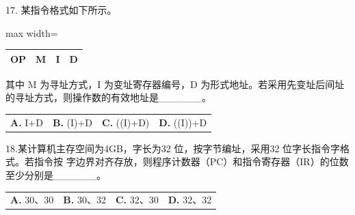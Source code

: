 \documentclass[UTF8,11pt]{ctexart}
\begin{document}
17. 某指令格式如下所示。


\begin{center}\begin{adjustbox}{max width=\linewidth}\begin{tabular}{|>{\raggedright\arraybackslash}p{\dimexpr(\linewidth-8\tabcolsep-5\arrayrulewidth)/4\relax}|>{\raggedright\arraybackslash}p{\dimexpr(\linewidth-8\tabcolsep-5\arrayrulewidth)/4\relax}|>{\raggedright\arraybackslash}p{\dimexpr(\linewidth-8\tabcolsep-5\arrayrulewidth)/4\relax}|>{\raggedright\arraybackslash}p{\dimexpr(\linewidth-8\tabcolsep-5\arrayrulewidth)/4\relax}|}\hline
OP & M & I & D\\\hline\end{tabular}\end{adjustbox}\end{center}

其中 M 为寻址方式，I 为变址寄存器编号，D 为形式地址。若采用先变址后间址的寻址方式，则操作数的有效地址是\_\_\_\_\_\_。


\begin{center}\begin{tabular}{>{\raggedright\arraybackslash}p{\dimexpr(\linewidth-8\tabcolsep)/4\relax}>{\raggedright\arraybackslash}p{\dimexpr(\linewidth-8\tabcolsep)/4\relax}>{\raggedright\arraybackslash}p{\dimexpr(\linewidth-8\tabcolsep)/4\relax}>{\raggedright\arraybackslash}p{\dimexpr(\linewidth-8\tabcolsep)/4\relax}}
\textbf{A.} I+D & \textbf{B.} (I)+D & \textbf{C.} ((I)+D) & \textbf{D.} ((I))+D\\[.35em]\end{tabular}\end{center}

18.某计算机主存空间为4GB，字长为32 位，按字节编址，采用32 位字长指令字格式。若指令按 字边界对齐存放，则程序计数器（PC）和指令寄存器（IR）的位数至少分别是\_\_\_\_\_\_。


\begin{center}\begin{tabular}{>{\raggedright\arraybackslash}p{\dimexpr(\linewidth-8\tabcolsep)/4\relax}>{\raggedright\arraybackslash}p{\dimexpr(\linewidth-8\tabcolsep)/4\relax}>{\raggedright\arraybackslash}p{\dimexpr(\linewidth-8\tabcolsep)/4\relax}>{\raggedright\arraybackslash}p{\dimexpr(\linewidth-8\tabcolsep)/4\relax}}
\textbf{A.} 30、30 & \textbf{B.} 30、32 & \textbf{C.} 32、30 & \textbf{D.} 32、32\\[.35em]\end{tabular}\end{center}
\end{document}
